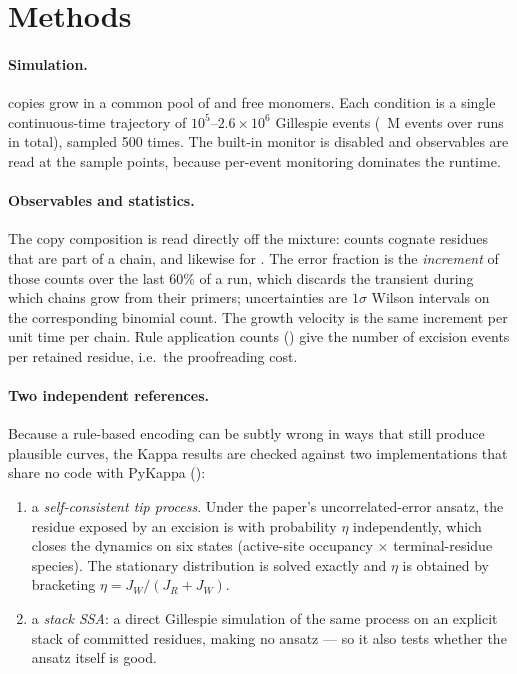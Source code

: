 \section{Methods}

\paragraph{Simulation.}  \parnchains{} copies grow in a common pool of \parconc{}
 and \parconc{}  free monomers.  Each condition is a single
continuous-time trajectory of $10^5$--$2.6\times10^6$ Gillespie events
(\nevents{}~M events over \njobs{} runs in total), sampled 500 times.  The built-in
monitor is disabled and observables are read at the sample points, because per-event
monitoring dominates the runtime.

\paragraph{Observables and statistics.}  The copy composition is read directly off the
mixture:  counts cognate residues that
are part of a chain, and likewise for .  The error fraction is the
\emph{increment} of those counts over the last $60\%$ of a run, which discards the
transient during which chains grow from their primers; uncertainties are $1\sigma$
Wilson intervals on the corresponding binomial count.  The growth velocity is the same
increment per unit time per chain.  Rule application counts () give
the number of excision events per retained residue, i.e.\ the proofreading cost.

\paragraph{Two independent references.}  Because a rule-based encoding can be subtly
wrong in ways that still produce plausible curves, the Kappa results are checked against
two implementations that share no code with PyKappa ():
\begin{enumerate}\itemsep1pt
\item a \emph{self-consistent tip process}.  Under the paper's uncorrelated-error
  ansatz, the residue exposed by an excision is  with probability $\eta$
  independently, which closes the dynamics on six states (active-site occupancy
  $\times$ terminal-residue species).  The stationary distribution is solved exactly and
  $\eta$ is obtained by bracketing $\eta=J_W/(J_R+J_W)$.
\item a \emph{stack SSA}: a direct Gillespie simulation of the same process on an
  explicit stack of committed residues, making no ansatz --- so it also tests whether
  the ansatz itself is good.
\end{enumerate}

